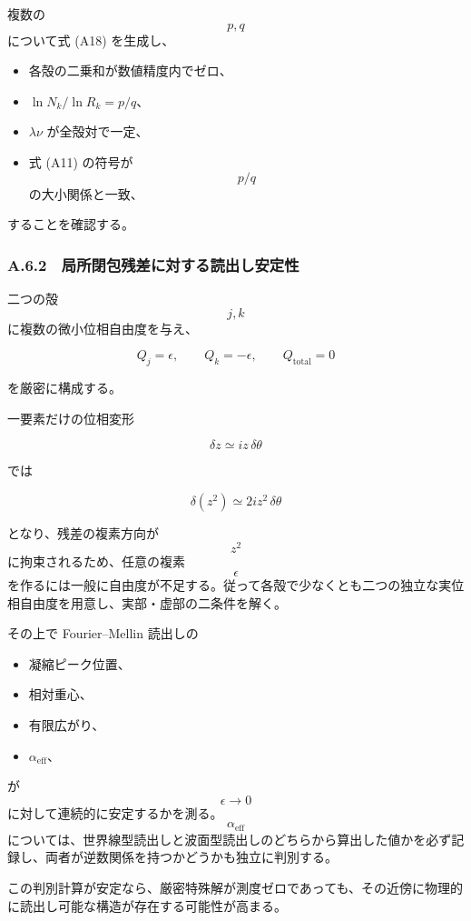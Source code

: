 \documentclass[
  a4paper,
]{ltjsarticle}
\providecommand{\tightlist}{%
  \setlength{\itemsep}{0pt}\setlength{\parskip}{0pt}}
\begin{document}
複数の \[p,q\] について式 (A18) を生成し、

\begin{itemize}
\tightlist
\item
  各殻の二乗和が数値精度内でゼロ、
\item
  \(\ln N_k/\ln R_k=p/q\)、
\item
  \(\lambda\nu\) が全殻対で一定、
\item
  式 (A11) の符号が \[p/q\] の大小関係と一致、
\end{itemize}

することを確認する。

\subsubsection{A.6.2　局所閉包残差に対する読出し安定性}\label{a.6.2-ux5c40ux6240ux9589ux5305ux6b8bux5deeux306bux5bfeux3059ux308bux8aadux51faux3057ux5b89ux5b9aux6027}

二つの殻 \[j,k\] に複数の微小位相自由度を与え、

\[
Q_j=\epsilon,
\qquad
Q_k=-\epsilon,
\qquad
Q_{\mathrm{total}}=0
\tag{A26}
\]

を厳密に構成する。

一要素だけの位相変形

\[
\delta z
\simeq
iz\,\delta\theta
\]

では

\[
\delta(z^2)
\simeq
2iz^2\,\delta\theta
\tag{A27}
\]

となり、残差の複素方向が \[z^2\] に拘束されるため、任意の複素
\[\epsilon\]
を作るには一般に自由度が不足する。従って各殻で少なくとも二つの独立な実位相自由度を用意し、実部・虚部の二条件を解く。

その上で Fourier--Mellin 読出しの

\begin{itemize}
\tightlist
\item
  凝縮ピーク位置、
\item
  相対重心、
\item
  有限広がり、
\item
  \(\alpha_{\mathrm{eff}}\)、
\end{itemize}

が \[\epsilon\to0\]
に対して連続的に安定するかを測る。\[\alpha_{\mathrm{eff}}\]
については、世界線型読出しと波面型読出しのどちらから算出した値かを必ず記録し、両者が逆数関係を持つかどうかも独立に判別する。

この判別計算が安定なら、厳密特殊解が測度ゼロであっても、その近傍に物理的に読出し可能な構造が存在する可能性が高まる。
\end{document}
